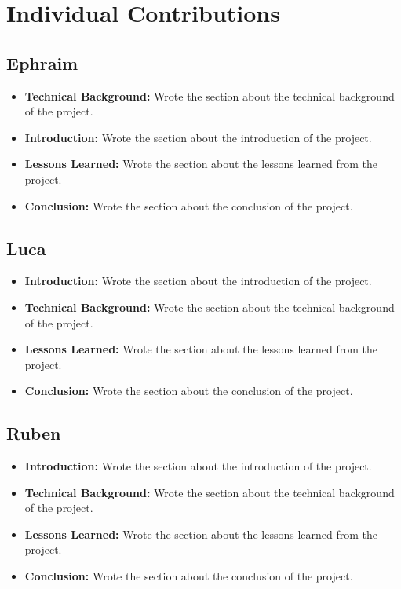 \section{Individual Contributions}

\subsection{Ephraim}

\begin{itemize}
    \item \textbf{Technical Background:} Wrote the section about the technical background of the project.
    \item \textbf{Introduction:} Wrote the section about the introduction of the project.
    \item \textbf{Lessons Learned:} Wrote the section about the lessons learned from the project.
    \item \textbf{Conclusion:} Wrote the section about the conclusion of the project.
\end{itemize}

\subsection{Luca}

\begin{itemize}
    \item \textbf{Introduction:} Wrote the section about the introduction of the project.
    \item \textbf{Technical Background:} Wrote the section about the technical background of the project.
    \item \textbf{Lessons Learned:} Wrote the section about the lessons learned from the project.
    \item \textbf{Conclusion:} Wrote the section about the conclusion of the project.
\end{itemize}

\subsection{Ruben}

\begin{itemize}
    \item \textbf{Introduction:} Wrote the section about the introduction of the project.
    \item \textbf{Technical Background:} Wrote the section about the technical background of the project.
    \item \textbf{Lessons Learned:} Wrote the section about the lessons learned from the project.
    \item \textbf{Conclusion:} Wrote the section about the conclusion of the project.
\end{itemize}

